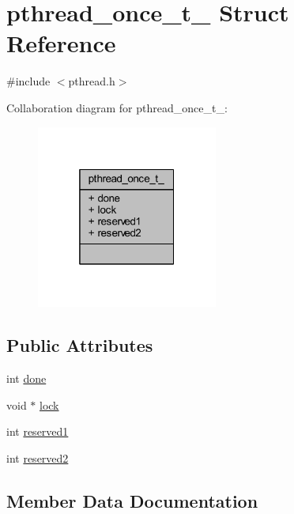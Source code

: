 \hypertarget{structpthread__once__t__}{}\section{pthread\+\_\+once\+\_\+t\+\_\+ Struct Reference}
\label{structpthread__once__t__}


{\ttfamily \#include $<$pthread.\+h$>$}



Collaboration diagram for pthread\+\_\+once\+\_\+t\+\_\+\+:
\nopagebreak
\begin{figure}[H]
\begin{center}
\leavevmode
\includegraphics[width=169pt]{structpthread__once__t____coll__graph}
\end{center}
\end{figure}
\subsection*{Public Attributes}
\begin{DoxyCompactItemize}
\item 
int \mbox{\hyperlink{structpthread__once__t___a863ce43daa3b264c20a79f9c3eb65b06}{done}}
\item 
void $\ast$ \mbox{\hyperlink{structpthread__once__t___a9e674c271b3500a3fb315ba6a26587d8}{lock}}
\item 
int \mbox{\hyperlink{structpthread__once__t___ac92841b1c04034128491e463297b4c3d}{reserved1}}
\item 
int \mbox{\hyperlink{structpthread__once__t___aaef156d8d36d991e6f113b0ec0c481b4}{reserved2}}
\end{DoxyCompactItemize}


\subsection{Member Data Documentation}
\mbox{\label{structpthread__once__t___a863ce43daa3b264c20a79f9c3eb65b06}} 

